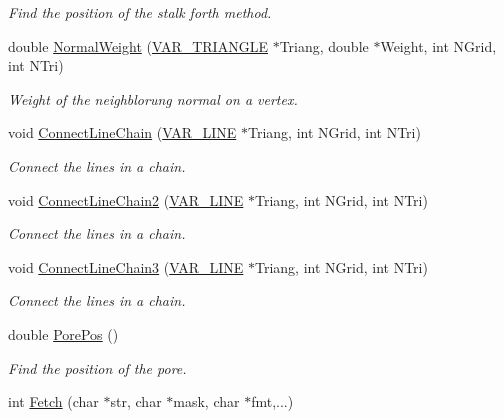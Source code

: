 \begin{DoxyCompactItemize}
\begin{DoxyCompactList}\small\item\em Find the position of the stalk forth method. \end{DoxyCompactList}\item 
double \hyperlink{classVarData_a4af146ff5f41159dbc594bf50a1b1820}{Normal\+Weight} (\hyperlink{structVAR__TRIANGLE}{V\+A\+R\+\_\+\+T\+R\+I\+A\+N\+G\+LE} $\ast$Triang, double $\ast$Weight, int N\+Grid, int N\+Tri)\hypertarget{classVarData_a4af146ff5f41159dbc594bf50a1b1820}{}\label{classVarData_a4af146ff5f41159dbc594bf50a1b1820}

\begin{DoxyCompactList}\small\item\em Weight of the neighblorung normal on a vertex. \end{DoxyCompactList}\item 
void \hyperlink{classVarData_abeac0d2b6f91beee12e2506a41eca70c}{Connect\+Line\+Chain} (\hyperlink{structVAR__LINE}{V\+A\+R\+\_\+\+L\+I\+NE} $\ast$Triang, int N\+Grid, int N\+Tri)
\begin{DoxyCompactList}\small\item\em Connect the lines in a chain. \end{DoxyCompactList}\item 
void \hyperlink{classVarData_a2e9b9e5912554bc52210356f6e2b1bc8}{Connect\+Line\+Chain2} (\hyperlink{structVAR__LINE}{V\+A\+R\+\_\+\+L\+I\+NE} $\ast$Triang, int N\+Grid, int N\+Tri)
\begin{DoxyCompactList}\small\item\em Connect the lines in a chain. \end{DoxyCompactList}\item 
void \hyperlink{classVarData_a1f3c69ce2b4b130fead4373fa76700f3}{Connect\+Line\+Chain3} (\hyperlink{structVAR__LINE}{V\+A\+R\+\_\+\+L\+I\+NE} $\ast$Triang, int N\+Grid, int N\+Tri)
\begin{DoxyCompactList}\small\item\em Connect the lines in a chain. \end{DoxyCompactList}\item 
double \hyperlink{classVarData_a90139ee28a0c75803648d2b1d85e80ce}{Pore\+Pos} ()\hypertarget{classVarData_a90139ee28a0c75803648d2b1d85e80ce}{}\label{classVarData_a90139ee28a0c75803648d2b1d85e80ce}

\begin{DoxyCompactList}\small\item\em Find the position of the pore. \end{DoxyCompactList}\item 
int \hyperlink{classVarData_a795f774737c0deac9dfac3edb068526e}{Fetch} (char $\ast$str, char $\ast$mask, char $\ast$fmt,...)\hypertarget{classVarData_a795f774737c0deac9dfac3edb068526e}{}\label{classVarData_a795f774737c0deac9dfac3edb068526e}


\end{DoxyCompactItemize}
